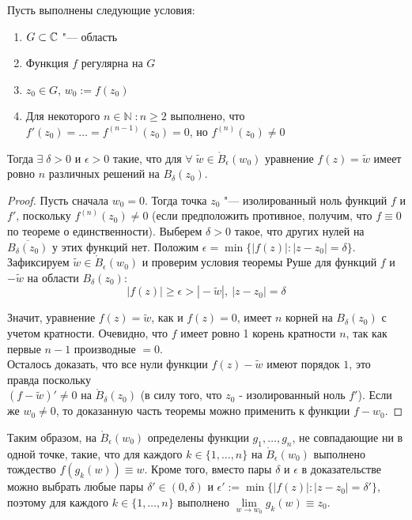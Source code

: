 \begin{theorem}\label{local-structure}
	Пусть выполнены следующие условия:
	\begin{enumerate}
		\item $G \subset \mathbb{C}$ "--- область
		\item Функция $f$ регулярна на $G$
		\item $z_0 \in G$, $w_0 := f(z_0)$
		\item Для некоторого $n \in \mathbb{N} \; : n \ge 2$ выполнено, что $f'(z_0) = \ldots = f^{(n - 1)}(z_0) = 0$, но $f^{(n)}(z_0) \ne 0$
	\end{enumerate}
	
	Тогда $\exists \; \delta > 0$ и $\epsilon > 0$ такие, что для $ \forall \; \widetilde w \in \mathring B_\epsilon(w_0)$ уравнение $f(z) = \widetilde w$ имеет ровно $n$ различных решений на $B_\delta(z_0)$.
\end{theorem}

\begin{proof}
	Пусть сначала $w_0 = 0$. Тогда точка $z_0$ "--- изолированный ноль функций $f$ и $f'$, поскольку $f^{(n)}(z_0) \ne 0$ (если предположить противное, получим, что $f \equiv 0$ по теореме о единственности). Выберем $\delta > 0$ такое, что других нулей на $\overline{B_\delta(z_0)}$ у этих функций нет. Положим $\epsilon = \min\{|f(z)| : |z - z_0| = \delta\}$. Зафиксируем $\widetilde w \in \mathring B_\epsilon(w_0)$ и проверим условия теоремы Руше для функций $f$ и $-\widetilde{w}$ на области $B_\delta(z_0)$:
	\[|f(z)| \ge \epsilon > |\!-\!\widetilde{w}|,~|z - z_0| = \delta\]
	
	Значит, уравнение $f(z) = \widetilde w$, как и $f(z) = 0$, имеет $n$ корней на $B_\delta(z_0)$ с учетом кратности. Очевидно, что $f$ имеет ровно 1 корень кратности $n$,  так как первые $n - 1$ производные $= 0$. \\Осталось доказать, что все нули функции $f(z) - \widetilde w$ имеют порядок $1$, это правда поскольку \\ $(f- \widetilde w)' \ne 0$ на $\mathring B_\delta(z_0)$ (в силу того, что $z_0$ - изолированный ноль $f'$). Если же $w_0 \ne 0$, то доказанную часть теоремы можно применить к функции $f - w_0$.
\end{proof}

\begin{note}
	Таким образом, на $\mathring B_\epsilon(w_0)$ определены функции $g_1, \dotsc, g_n$, не совпадающие ни в одной точке, такие, что для каждого $k \in \{1, \dotsc, n\}$ на $\mathring B_\epsilon(w_0)$ выполнено тождество $f(g_k(w)) \equiv w$. Кроме того, вместо пары $\delta$ и $\epsilon$ в доказательстве можно выбрать любые пары $\delta' \in (0, \delta)$ и $\epsilon' := \min\{|f(z)| : |z - z_0| = \delta'\}$, поэтому для каждого $k \in \{1, \dotsc, n\}$ выполнено $\lim\limits_{w \to w_0}g_k(w) \equiv z_0$.
\end{note}

